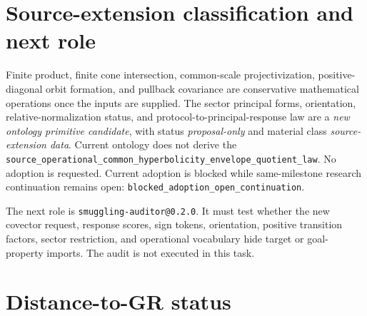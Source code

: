 \documentclass[11pt]{article}
\begin{document}
\section{Source-extension classification and next role}

Finite product, finite cone intersection, common-scale projectivization,
positive-diagonal orbit formation, and pullback covariance are conservative
mathematical operations once the inputs are supplied.  The sector principal
forms, orientation, relative-normalization status, and
protocol-to-principal-response law are a
\emph{new ontology primitive candidate}, with status
\emph{proposal-only} and material class \emph{source-extension data}.
Current ontology does not derive the
\texttt{source\_operational\_common\_hyperbolicity\_envelope\_quotient\_law}.
No adoption is requested.  Current adoption is blocked while same-milestone
research continuation remains open:
\texttt{blocked\_adoption\_open\_continuation}.

The next role is \texttt{smuggling-auditor@0.2.0}.  It must test whether the
new covector request, response scores, sign tokens, orientation, positive
transition factors, sector restriction, and operational vocabulary hide target
or goal-property imports.  The audit is not executed in this task.

\section{Distance-to-GR status}
\end{document}
